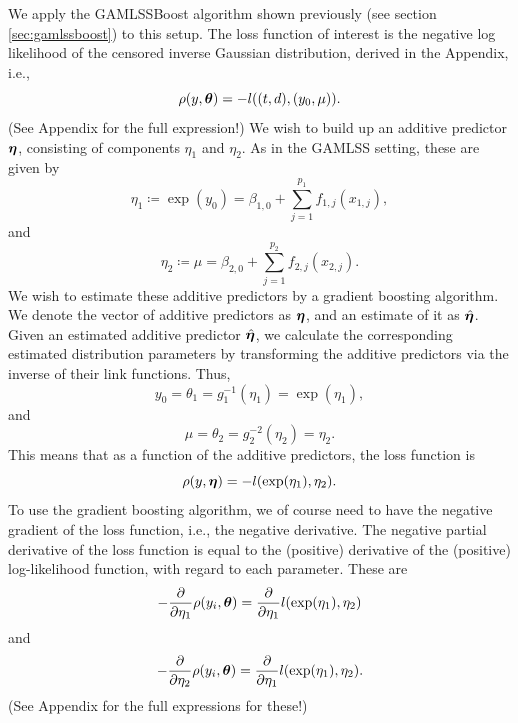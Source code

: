 We apply the GAMLSSBoost algorithm shown previously (see section \ref{sec:gamlssboost}) to this setup. The loss function of interest is
the negative log likelihood of the censored inverse Gaussian distribution, derived in the Appendix, i.e.,
\begin{equation*}
    \rho(y,\boldsymbol{\theta})=-l((t,d), (y_0,\mu)).
\end{equation*}
(See Appendix for the full expression!)
We wish to build up an additive predictor $\boldsymbol{\eta}$, consisting of components $\eta_1$ and $\eta_2$. As in the GAMLSS setting, these are given by
\begin{equation}
    \eta_1\coloneqq \exp(y_0)=\beta_{1,0}+\sum_{j=1}^{p_1}f_{1,j}(x_{1,j}),
\end{equation}
and
\begin{equation}
    \eta_2\coloneqq \mu=\beta_{2,0}+\sum_{j=1}^{p_2}f_{2,j}(x_{2,j}).
\end{equation}
We wish to estimate these additive predictors by a gradient boosting algorithm.
We denote the vector of additive predictors as $\boldsymbol{\eta}$, and an estimate of it as $\hat{\boldsymbol{\eta}}$.
Given an estimated additive predictor $\hat{\boldsymbol{\eta}}$, we calculate the corresponding estimated distribution parameters by transforming the additive predictors via the inverse of their link functions.
Thus,
\begin{equation}
    y_0=\theta_1=g_1^{-1}(\eta_1)=\exp(\eta_1),
\end{equation}
and
\begin{equation}
    \mu=\theta_2=g_2^{-2}(\eta_2)=\eta_2.
\end{equation}
This means that as a function of the additive predictors, the loss function is
\begin{equation*}
    \rho(y,\boldsymbol{\eta})=-l(\exp(\eta_1), \eta_2).
\end{equation*}
To use the gradient boosting algorithm, we of course need to have the negative gradient of the loss function, i.e., the negative derivative. 
The negative partial derivative of the loss function is equal to the (positive) derivative of the (positive) log-likelihood function, with regard to each parameter.
These are
\begin{equation}
    -\frac{\partial}{\partial\eta_1}\rho(y_i,\boldsymbol{\theta})=\frac{\partial}{\partial\eta_1}l(\exp(\eta_1), \eta_2)
\end{equation}
and
\begin{equation}
    -\frac{\partial}{\partial\eta_2}\rho(y_i,\boldsymbol{\theta})=\frac{\partial}{\partial\eta_1}l(\exp(\eta_1), \eta_2).
\end{equation}
(See Appendix for the full expressions for these!)

